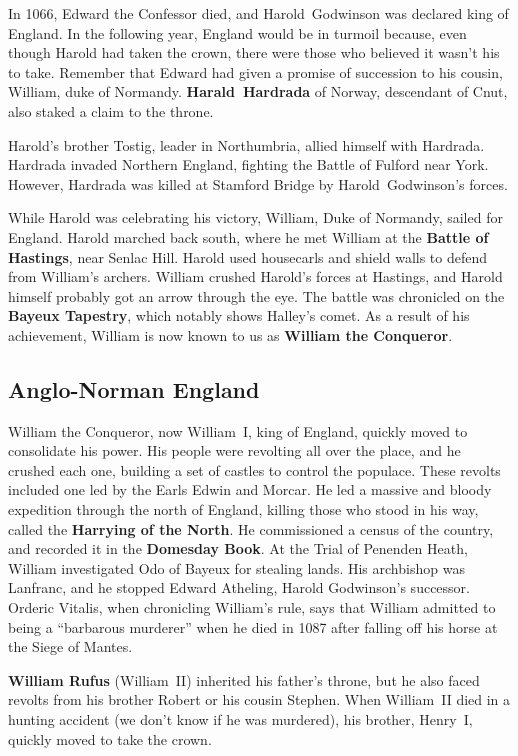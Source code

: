 In 1066, Edward the Confessor died, and Harold~Godwinson was declared king of England.
In the following year, England would be in turmoil because,
even though Harold had taken the crown, there were those who believed it wasn't his to take.
Remember that Edward had given a promise of succession to his cousin, William, duke of Normandy.
\textbf{Harald~Hardrada} of Norway, descendant of Cnut, also staked a claim to the throne.

Harold's brother Tostig, leader in Northumbria, allied himself with Hardrada.
Hardrada invaded Northern England, fighting the Battle of Fulford near York.
However, Hardrada was killed at Stamford Bridge by Harold~Godwinson's forces.

While Harold was celebrating his victory, William, Duke of Normandy, sailed for England.
Harold marched back south, where he met William at the \textbf{Battle of Hastings}, near Senlac Hill.
Harold used housecarls and shield walls to defend from William's archers.
William crushed Harold's forces at Hastings, and Harold himself probably got an arrow through the eye.
The battle was chronicled on the \textbf{Bayeux Tapestry}, which notably shows Halley's comet.
As a result of his achievement, William is now known to us as \textbf{William the Conqueror}.

\subsection*{Anglo-Norman England}

William the Conqueror, now William~I, king of England, quickly moved to consolidate his power.
His people were revolting all over the place, and he crushed each one,
building a set of castles to control the populace.
These revolts included one led by the Earls Edwin and Morcar.
He led a massive and bloody expedition through the north of England,
killing those who stood in his way, called the \textbf{Harrying of the North}.
He commissioned a census of the country, and recorded it in the \textbf{Domesday Book}.
At the Trial of Penenden Heath, William investigated Odo of Bayeux for stealing lands.
His archbishop was Lanfranc, and he stopped Edward Atheling, Harold Godwinson's successor.
Orderic Vitalis, when chronicling William's rule, says that William admitted to being a ``barbarous murderer''
when he died in 1087 after falling off his horse at the Siege of Mantes.

\textbf{William Rufus} (William~II) inherited his father's throne,
but he also faced revolts from his brother Robert or his cousin Stephen.
When William~II died in a hunting accident (we don't know if he was murdered),
his brother, Henry~I, quickly moved to take the crown.

